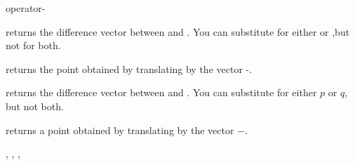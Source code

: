 \begin{ccRefFunction}{operator-}


       {returns the difference vector between  and . 
        You can substitute  for either  or 
        ,but not for both.}

       {returns the point obtained by translating  by the 
        vector -.}


       {returns the difference vector between  and .
        You can substitute  for either $p$
	or $q$, but not both.}

       {returns a point obtained by translating  by the 
        vector $-$.}

\ccSeeAlso

, , , 

\end{ccRefFunction}

